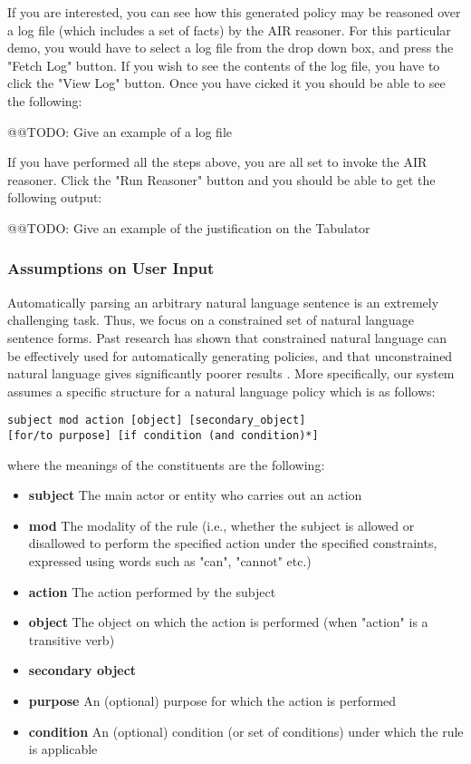 \documentclass{llncs}
\begin{document}
If you are interested, you can see how this generated policy may be reasoned over a log file (which includes a set of facts) by the AIR reasoner. For this particular demo, you would have to select a log file from the drop down box, and press the "Fetch Log" button. If you wish to see the contents of the log file, you have to click the "View Log" button. Once you have cicked it you should be able to see the following:

@@TODO: Give an example of a log file

If you have performed all the steps above, you are all set to invoke the AIR reasoner. Click the "Run Reasoner" button and you should be able to get the following output:

@@TODO: Give an example of the justification on the Tabulator

\subsubsection{Assumptions on User Input}

Automatically parsing an arbitrary natural language sentence is an extremely challenging task. Thus, we focus on a constrained set of natural language sentence forms. Past research has shown that constrained natural language can be effectively used for automatically generating policies, and that unconstrained natural language gives significantly poorer results \cite{karat,sparcle}. More specifically, our system assumes a specific structure for a natural language policy which is as follows:

\begin{verbatim}
subject mod action [object] [secondary_object] 
[for/to purpose] [if condition (and condition)*]
\end{verbatim}

where the meanings of the constituents are the following:

\begin{itemize}
\item \textbf{subject} The main actor or entity who carries out an action
\item \textbf{mod} The modality of the rule (i.e., whether the subject is allowed or disallowed to perform the specified action under the specified constraints, expressed using words such as "can", "cannot" etc.)
\item \textbf{action} The action performed by the subject
\item \textbf{object} The object on which the action is performed (when "action" is a transitive verb)
\item \textbf{secondary object} 
\item \textbf{purpose} An (optional) purpose for which the action is performed
\item \textbf{condition} An (optional) condition (or set of conditions) under which the rule is applicable
\end{itemize}
\end{document}
